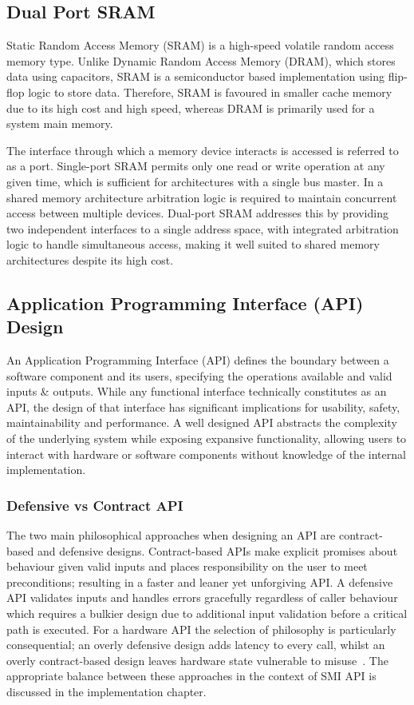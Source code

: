 \documentclass[final]{cmpreport}
\begin{document}
\subsection{Dual Port SRAM}
Static Random Access Memory (SRAM) is a high-speed volatile random access memory type. Unlike Dynamic Random Access Memory (DRAM), which stores data using capacitors, SRAM is a semiconductor based implementation using flip-flop logic to store data. Therefore, SRAM is favoured in smaller cache memory due to its high cost and high speed, whereas DRAM is primarily used for a system main memory.

The interface through which a memory device interacts is accessed is referred to as a port. Single-port SRAM permits only one read or write operation at any given time, which is sufficient for architectures with a single bus master. In a shared memory architecture arbitration logic is required to maintain concurrent access between multiple devices. Dual-port SRAM addresses this by providing two independent interfaces to a single address space, with integrated arbitration logic to handle simultaneous access, making it well suited to shared memory architectures despite its high cost.

\subsection{Application Programming Interface (API) Design}
An Application Programming Interface (API) defines the boundary between a software component and its users, specifying the operations available and valid inputs \& outputs. While any functional interface technically constitutes as an API, the design of that interface has significant implications for usability, safety, maintainability and performance. A well designed API abstracts the complexity of the underlying system while exposing expansive functionality, allowing users to interact with hardware or software components without knowledge of the internal implementation.

\subsubsection{Defensive vs Contract API}
The two main philosophical approaches when designing an API are contract-based and defensive designs. Contract-based APIs make explicit promises about behaviour given valid inputs and places responsibility on the user to meet preconditions; resulting in a faster and leaner yet unforgiving API\@. A defensive API validates inputs and handles errors gracefully regardless of caller behaviour which requires a bulkier design due to additional input validation before a critical path is executed. For a hardware API the selection of philosophy is particularly consequential; an overly defensive design adds latency to every call, whilst an overly contract-based design leaves hardware state vulnerable to misuse~\cite{khlebnikovContractsUndefinedBehavior}. The appropriate balance between these approaches in the context of SMI API is discussed in the implementation chapter.
\end{document}
